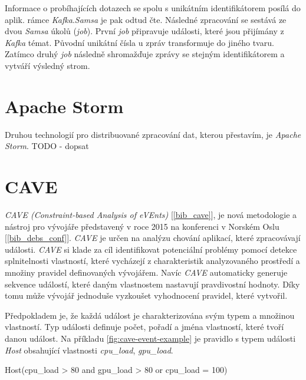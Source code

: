 \documentclass[
  digital, %
  table,   %
  nolof,     %
  nolot,     %
  oneside, %
  nocover,
  monochrome,
  12pt
]{fithesis3}
\begin{document}
Informace o probíhajících dotazech se spolu s unikátním identifikátorem posílá do aplik. rámce \textit{Kafka}.\textit{Samsa} je pak odtud čte. Následné zpracování se sestává ze dvou \textit{Samsa} úkolů (\textit{job}). První \textit{job} připravuje události, které jsou přijímány z \textit{Kafka} témat. Původní unikátní čísla u zpráv transformuje do jiného tvaru. Zatímco druhý \textit{job} následně shromažďuje zprávy se stejným identifikátorem a vytváří výsledný strom.

\section{Apache Storm}
Druhou technologií pro distribuované zpracování dat, kterou přestavím, je \textit{Apache Storm}.
TODO - dopsat
\section{CAVE}
\textit{CAVE (Constraint-based Analysis of eVEnts)} [\ref{bib_cave}], je nová metodologie a nástroj pro vývojáře představený v roce 2015 na konferenci v Norském Oslu [\ref{bib_debs_conf}]. \textit{CAVE} je určen na analýzu chování aplikací, které zpracovávají události. \textit{CAVE} si klade za cíl identifikovat potenciální problémy pomocí detekce splnitelnosti vlastností, které vycházejí z charakteristik analyzovaného prostředí a množiny pravidel definovaných vývojářem. Navíc \textit{CAVE} automaticky generuje sekvence událostí, které daným vlastnostem nastavují pravdivostní hodnoty. Díky tomu může vývojář jednoduše vyzkoušet vyhodnocení pravidel, které vytvořil.

Předpokladem je, že každá událost je charakterizována svým typem a množinou vlastností. Typ události definuje počet, pořadí a jména vlastností, které tvoří danou událost. Na příkladu \ref{fig:cave-event-example} je pravidlo s typem události \textit{Host} obsahující vlastnosti \textit{cpu\_load}, \textit{gpu\_load}.

\begin{center}
\begin{minipage}[H]{.97\linewidth}
	\begin{mylisting}
Host(cpu_load > 80 and gpu_load > 80 or cpu_load = 100)
	\end{mylisting}
	\label{fig:cave-event-example} 
\end{minipage}
\end{center}
\end{document}
